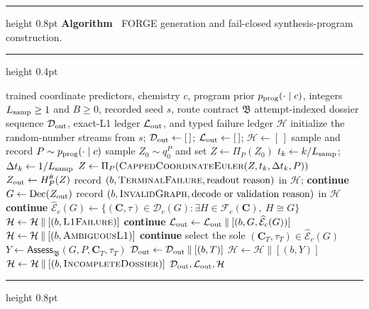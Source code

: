 \documentclass{article}
\theoremstyle{definition}
\begin{document}
\begingroup
\setlength{\parskip}{0pt}
\hrule height 0.8pt\kern 2pt
\noindent\textbf{Algorithm~\thealgorithm} FORGE generation and fail-closed synthesis-program construction.
\label{alg:forge-inference}
\par\nobreak\kern 2pt\hrule height 0.4pt\nobreak
\begin{algorithmic}[1]
\Require trained coordinate predictors, chemistry $c$, program prior $p_{\rm prog}(\cdot\mid c)$,
integers $L_{\rm samp}\geq1$ and $B\geq0$, recorded seed $s$, route contract $\mathfrak B$
\Ensure attempt-indexed dossier sequence $\mathcal D_{\rm out}$, exact-L1 ledger $\mathcal L_{\rm out}$,
and typed failure ledger $\mathcal H$
\State initialize the random-number streams from $s$;
$\mathcal D_{\rm out}\gets[\,]$; $\mathcal L_{\rm out}\gets[\,]$; $\mathcal H\gets[\,]$
    \State sample and record $P\sim p_{\rm prog}(\cdot\mid c)$
    \State sample $Z_0\sim q_0^P$ and set $Z\gets\Pi_P(Z_0)$
        \State $t_k\gets k/L_{\rm samp}$; $\Delta t_k\gets1/L_{\rm samp}$
        \State $Z\gets\Pi_P\!\left(\Call{CappedCoordinateEuler}{Z,t_k,\Delta t_k,P}\right)$
    \EndFor
    \State $Z_{\rm out}\gets H_P^\theta(Z)$ 
        \State record $(b,\textsc{TerminalFailure},\text{readout reason})$ in $\mathcal H$; \textbf{continue}
    \EndIf
    \State $G\gets\operatorname{Dec}(Z_{\rm out})$
        \State record $(b,\textsc{InvalidGraph},\text{decode or validation reason})$ in $\mathcal H$
        \State \textbf{continue}
    \EndIf
    \State $\widehat{\mathcal{E}}_c(G)\gets
    \{(\mathbf C,\tau)\in\mathcal D_c(G):\exists H\in\mathcal F_c(\mathbf C),\ H\cong G\}$
        \State $\mathcal H\gets\mathcal H\mathbin{\|}[(b,\textsc{L1Failure})]$
        \State \textbf{continue}
    \EndIf
    \State $\mathcal L_{\rm out}\gets\mathcal L_{\rm out}\mathbin{\|}
    [(b,G,\widehat{\mathcal E}_c(G))]$
        \State $\mathcal H\gets\mathcal H\mathbin{\|}[(b,\textsc{AmbiguousL1})]$
        \State \textbf{continue}
    \EndIf
    \State select the sole $(\mathbf C_T,\tau_T)\in\widehat{\mathcal E}_c(G)$
    \State $Y\gets\mathsf{Assess}_{\mathfrak B}(G,P,\mathbf C_T,\tau_T)$
        \State $\mathcal D_{\rm out}\gets\mathcal D_{\rm out}\mathbin{\|}
        [(b,T)]$
        \State $\mathcal H\gets\mathcal H\mathbin{\|}[(b,Y)]$
    \Else
        \State $\mathcal H\gets\mathcal H\mathbin{\|}[(b,\textsc{IncompleteDossier})]$
    \EndIf
\EndFor
\State \Return $\mathcal D_{\rm out},\mathcal L_{\rm out},\mathcal H$
\end{algorithmic}
\nopagebreak\hrule height 0.8pt
\endgroup
\end{document}
